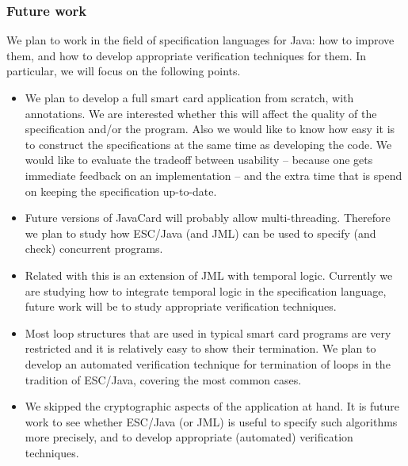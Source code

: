 \documentclass[a4paper]{llncs}
\begin{document}
\subsubsection{Future work} We plan to work in the field of
specification languages for Java: how to improve them, and how to
develop appropriate verification techniques for them. In particular,
we will focus on the following points.
\begin{itemize}
\item We plan to develop a full smart card application from scratch, with
annotations. We are interested whether this will affect the quality of 
the specification and/or the program. Also we would like to know how
easy it is to construct the specifications at the same time as
developing the code. We would like to evaluate the tradeoff between
usability -- because one gets immediate
feedback on an implementation -- and the extra time that
is spend on keeping the specification up-to-date.
\item Future versions of JavaCard will probably allow
multi-threading. Therefore we plan to study how ESC/Java (and JML)
can be used to specify (and check) concurrent programs.
\item Related with this is an extension of JML with
temporal logic. Currently we are studying how to integrate temporal
logic in the specification language, future work will be to study
appropriate verification techniques. 
\item Most loop structures that are used in typical smart card
programs are very restricted and it is relatively easy to show their
termination. We plan to develop an automated verification technique for
termination of loops in the tradition of ESC/Java, covering the most
common cases.
\item We skipped the cryptographic aspects of the application at
hand. It is future work to see whether ESC/Java (or JML) is useful to
specify such algorithms more precisely, and to develop appropriate
(automated) verification techniques.
\end{itemize}



\end{document}
